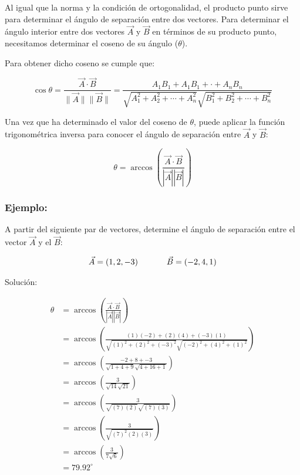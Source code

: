 \documentclass{article}
\begin{document}
        Al igual que la norma y la condición de ortogonalidad, el producto punto sirve para determinar el ángulo de separación entre dos vectores. Para determinar el ángulo interior entre dos vectores $\vec{A}$ y $\vec{B}$ en términos de su producto punto, necesitamos determinar el coseno de su ángulo ($\theta$).

        Para obtener dicho coseno se cumple que:

        \begin{equation}
            \cos \theta = \frac{\vec{A} \cdot \vec{B}}{\parallel\vec{A}\parallel\parallel\vec{B}\parallel} = \frac{A_{1} B_{1}+A_{1} B_{1}+\cdot+A_{n} B_{n}}{\sqrt{A_{1}^{2}+A_{2}^{2}+\cdots+A_{n}^{2}} \sqrt{B_{1}^{2}+B_{2}^{2}+\cdots+B_{n}^{2}}}
        \end{equation}

        Una vez que ha determinado el valor del coseno de $\theta$, puede aplicar la función trigonométrica inversa para conocer el ángulo de separación entre $\vec{A}$ y $\vec{B}$:

        \begin{equation}
            \theta=\arccos \left(\frac{\vec{A} \cdot \vec{B}}{|\vec{A}||\vec{B}|}\right)
        \end{equation}

        \subsubsection*{Ejemplo:}

            A partir del siguiente par de vectores, determine el ángulo de separación entre el vector $\vec{A}$ y el  $\vec{B}$:

            \begin{gather*}
                \vec{A}=(1,2,-3) \hspace*{35 pt} \vec{B}=(-2,4,1)
            \end{gather*}
        
            Solución:

            \begin{equation}
                \begin{aligned}
                \theta &=\arccos \left(\frac{\vec{A} \cdot \vec{B}}{|\vec{A}||\vec{B}|}\right) \\
                &=\arccos \left(\frac{(1)(-2)+(2)(4)+(-3)(1)}{\sqrt{(1)^{2}+(2)^{2}+(-3)^{2}} \sqrt{(-2)^{2}+(4)^{2}+(1)^{2}}}\right) \\
                &=\arccos \left(\frac{-2+8+-3}{\sqrt{1+4+9} \sqrt{4+16+1}}\right) \\
                &=\arccos \left(\frac{3}{\sqrt{14} \sqrt{21}}\right) \\
                &=\arccos \left(\frac{3}{\sqrt{(7)(2)} \sqrt{(7)(3)}}\right) \\
                &=\arccos \left(\frac{3}{\sqrt{(7)^{2}(2)(3)}}\right) \\
                &=\arccos \left(\frac{3}{7 \sqrt{6}}\right) \\
                &=79.92^{\circ}
                \end{aligned}
            \end{equation}
\end{document}
